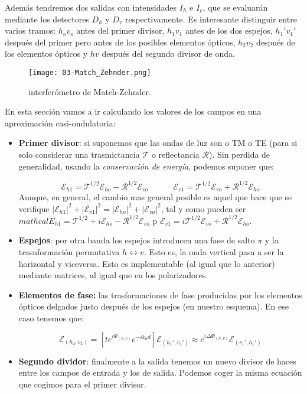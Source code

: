 \documentclass[12pt,a4paper]{book}
\numberwithin{equation}{section}
\numberwithin{figure}{section}
\newcommand{\tquad}{\quad \quad \quad}
\newcommand{\ccorchetes}[1]{\left[ #1  \right]}
\newcommand{\1}{_{(1)}}
\newcommand{\2}{_{(2)}}
\newcommand{\Ecal}{\mathcal{E}}
\theoremstyle{definition}
\begin{document}
Además tendremos dos salidas con intensidades $I_h$  e $I_v$, que se evaluarán mediante los detectores $D_h$ y $D_v$ respectivamente. Es interesante distinguir entre varios tramos: $h_ov_o$ antes del primer divisor, $h_1v_1$ antes de los dos espejos, $h_1'v_1'$ después del primer pero antes de los posibles elementos ópticos, $h_2v_2$ después de los elementos ópticos y $hv$ después del segundo divisor de onda.

\begin{figure}[h!] \centering
\texttt{[image: 03-Match\_Zehnder.png]}
\caption{interferómetro de Match-Zehnder.}
\label{Fig:03.4-01}
\end{figure}

En esta sección vamos a ir calculando los valores de los campos en una aproximación casi-ondulatoria:

\begin{itemize}
\item  \textbf{Primer divisor}: si suponemos que las ondas de luz son o TM o TE (para si solo considerar una trasmictancia $\mathcal{T}$ o reflectancia $\mathcal{R}$). Sin perdida de generalidad, usando la \textit{conservación de energía}, podemos suponer que:

\begin{equation}
\mathcal{E}_{h1} = \mathcal{T}^{1/2} \mathcal{E}_{ho} - \mathcal{R}^{1/2} \mathcal{E}_{vo} \tquad 
\mathcal{E}_{v1} = \mathcal{T}^{1/2} \mathcal{E}_{vo} + \mathcal{R}^{1/2} \mathcal{E}_{ho}
\end{equation}
Aunque, en general, el cambio mas general posible es aquel que hace que se verifique $|\mathcal{E}_{h1}|^2+|\mathcal{E}_{v1}|^2=|\mathcal{E}_{ho}|^2+|\mathcal{E}_{vo}|^2$, tal y como pueden ser $ mathcal{E}_{h1} = \mathcal{T}^{1/2} + i \mathcal{E}_{ho} - \mathcal{R}^{1/2} \mathcal{E}_{vo}$ p $ \mathcal{E}_{v1} = i \mathcal{T}^{1/2} \mathcal{E}_{vo} + \mathcal{R}^{1/2} \mathcal{E}_{ho} $.

\item \textbf{Espejos}: por otra banda los espejos introducen una fase de salto $\pi$ y la trasnformación permutativa $h \leftrightarrow v$. Esto es, la onda vertical pasa a ser la horizontal y viceversa. Esto es implementable (al igual que lo anterior) mediante matrices, al igual que en  los polarizadores. 

\item \textbf{Elementos de fase:} las trasformaciones de fase producidas por los elementos ópticos delgados justo después de los espejos (en nuestro esquema). En ese caso tenemos que: 

\begin{equation}
\Ecal_{(h_2,v_2)} = \ccorchetes{t e^{i\Phi_{(h,v)}} e^{-ik_0d}} \Ecal_{(h_1',v_1')} \approx e^{i\Delta\Phi_{(h,v)}} \Ecal_{(v_1',h_1')}
\end{equation}

\item \textbf{Segundo dividor}: finalmente a la salida tenemos un nuevo divisor de haces entre los campos de entrada y los de salida. Podemos coger la misma ecuación que cogimos para el primer divisor.
\end{itemize}
\end{document}
